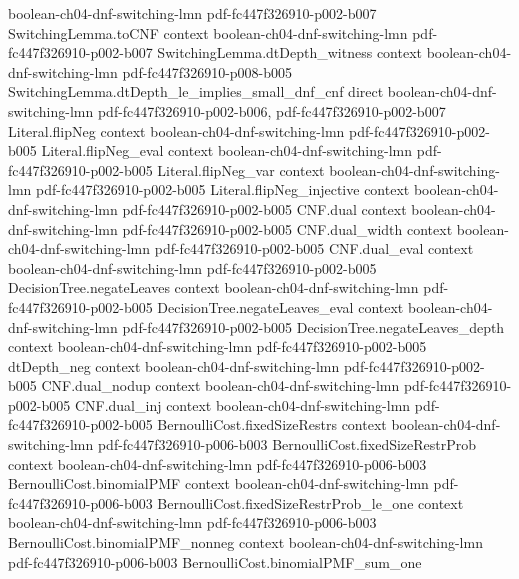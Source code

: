 \begin{lemma}
  {boolean-ch04-dnf-switching-lmn}
  {pdf-fc447f326910-p002-b007}
\proofstep
  {SwitchingLemma.toCNF}
  {context}
  {boolean-ch04-dnf-switching-lmn}
  {pdf-fc447f326910-p002-b007}
\proofstep
  {SwitchingLemma.dtDepth_witness}
  {context}
  {boolean-ch04-dnf-switching-lmn}
  {pdf-fc447f326910-p008-b005}
\proofstep
  {SwitchingLemma.dtDepth_le_implies_small_dnf_cnf}
  {direct}
  {boolean-ch04-dnf-switching-lmn}
  {pdf-fc447f326910-p002-b006,
    pdf-fc447f326910-p002-b007}
\proofstep
  {Literal.flipNeg}
  {context}
  {boolean-ch04-dnf-switching-lmn}
  {pdf-fc447f326910-p002-b005}
\proofstep
  {Literal.flipNeg_eval}
  {context}
  {boolean-ch04-dnf-switching-lmn}
  {pdf-fc447f326910-p002-b005}
\proofstep
  {Literal.flipNeg_var}
  {context}
  {boolean-ch04-dnf-switching-lmn}
  {pdf-fc447f326910-p002-b005}
\proofstep
  {Literal.flipNeg_injective}
  {context}
  {boolean-ch04-dnf-switching-lmn}
  {pdf-fc447f326910-p002-b005}
\proofstep
  {CNF.dual}
  {context}
  {boolean-ch04-dnf-switching-lmn}
  {pdf-fc447f326910-p002-b005}
\proofstep
  {CNF.dual_width}
  {context}
  {boolean-ch04-dnf-switching-lmn}
  {pdf-fc447f326910-p002-b005}
\proofstep
  {CNF.dual_eval}
  {context}
  {boolean-ch04-dnf-switching-lmn}
  {pdf-fc447f326910-p002-b005}
\proofstep
  {DecisionTree.negateLeaves}
  {context}
  {boolean-ch04-dnf-switching-lmn}
  {pdf-fc447f326910-p002-b005}
\proofstep
  {DecisionTree.negateLeaves_eval}
  {context}
  {boolean-ch04-dnf-switching-lmn}
  {pdf-fc447f326910-p002-b005}
\proofstep
  {DecisionTree.negateLeaves_depth}
  {context}
  {boolean-ch04-dnf-switching-lmn}
  {pdf-fc447f326910-p002-b005}
\proofstep
  {dtDepth_neg}
  {context}
  {boolean-ch04-dnf-switching-lmn}
  {pdf-fc447f326910-p002-b005}
\proofstep
  {CNF.dual_nodup}
  {context}
  {boolean-ch04-dnf-switching-lmn}
  {pdf-fc447f326910-p002-b005}
\proofstep
  {CNF.dual_inj}
  {context}
  {boolean-ch04-dnf-switching-lmn}
  {pdf-fc447f326910-p002-b005}
\proofstep
  {BernoulliCost.fixedSizeRestrs}
  {context}
  {boolean-ch04-dnf-switching-lmn}
  {pdf-fc447f326910-p006-b003}
\proofstep
  {BernoulliCost.fixedSizeRestrProb}
  {context}
  {boolean-ch04-dnf-switching-lmn}
  {pdf-fc447f326910-p006-b003}
\proofstep
  {BernoulliCost.binomialPMF}
  {context}
  {boolean-ch04-dnf-switching-lmn}
  {pdf-fc447f326910-p006-b003}
\proofstep
  {BernoulliCost.fixedSizeRestrProb_le_one}
  {context}
  {boolean-ch04-dnf-switching-lmn}
  {pdf-fc447f326910-p006-b003}
\proofstep
  {BernoulliCost.binomialPMF_nonneg}
  {context}
  {boolean-ch04-dnf-switching-lmn}
  {pdf-fc447f326910-p006-b003}
\proofstep
  {BernoulliCost.binomialPMF_sum_one}

\end{lemma}
